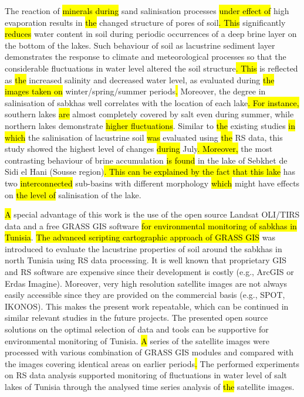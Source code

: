 \documentclass[land,article,submit,pdftex,moreauthors]{Definitions/mdpi}
\begin{document}
The reaction of \hl{minerals during }sand salinisation processes \hl{under effect of} high evaporation\hl{ }results in \hl{the }changed structure of pores of soil\hl{. This} significantly \hl{reduces} water content in soil\hl{ }during periodic occurrences of a deep brine layer on the bottom of the lakes. Such behaviour of soil as lacustrine sediment layer demonstrates the response to climate and meteorological processes so that the considerable fluctuations in water level altered the soil structure\hl{. This }is reflected as \hl{the }increased salinity and decreased water level, as evaluated during \hl{the images taken on }winter/spring/summer periods\hl{. }Moreover, the degree in salinisation of sabkhas well correlates with the location of each lake\hl{. For instance, } southern lakes \hl{are} almost completely covered by salt even during summer, while northern lakes demonstrate \hl{higher fluctuations}. Similar to \hl{the }existing studies \cite{BAYATI2021126032,SHENG2016129,SCHRODER20221710} \hl{in which} the salinisation of lacustrine soil \hl{was }evaluated using \hl{the }RS data, this study showed the highest level of changes \hl{during }July\hl{. Moreover, }the most contrasting behaviour of brine accumulation \hl{is found }in the lake of Sebkhet de Sidi el Hani (Sousse region)\hl{. This can be explained by the fact that this lake} has two \hl{interconnected} sub-basins with different morphology \hl{which} might have effects on \hl{the level of }salinisation of the lake. 

\hl{A }special advantage of this work is the use of the open source Landsat OLI/TIRS data and a free GRASS GIS software \hl{for  environmental monitoring of sabkhas in Tunisia}. \hl{The advanced scripting cartographic approach of GRASS GIS} was introduced to evaluate the lacustrine properties of soil around the sabkhas in north Tunisia using RS data processing. It is well known that proprietary GIS and RS software are expensive since their development is costly (e.g., ArcGIS or Erdas Imagine). Moreover, very high resolution satellite images are not always easily accessible since they are provided on the commercial basis (e.g., SPOT, IKONOS). This makes the present work repeatable, which can be continued in similar relevant studies in the future projects. The presented open source solutions on the optimal selection of data and tools can be supportive for environmental monitoring  of Tunisia. \hl{A }series of the satellite images were processed with various combination of GRASS GIS modules and compared with the images covering identical areas on earlier periods\hl{. }The performed experiments on RS data analysis supported monitoring of fluctuations in water level of salt lakes of Tunisia through the analysed time series analysis of \hl{the }satellite images. 
\end{document}
